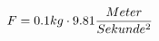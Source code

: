 \documentclass[preview]{standalone}
\begin{document}
\begin{align*}
\special{dvisvgm:raw <g id='unique000'>}F = 0.1 kg \cdot 9.81 \frac{Meter}{Sekunde^{2}}\special{dvisvgm:raw </g>}
\end{align*}
\end{document}
